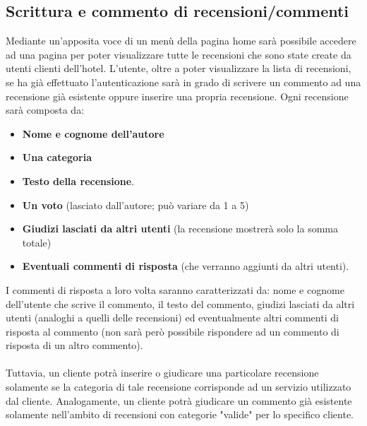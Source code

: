 \documentclass [a4paper, 12pt]{book}
\begin{document}
\subsection{Scrittura e commento di recensioni/commenti}
\label{Recensioni}
Mediante un'apposita voce di un menù della pagina home sarà possibile accedere ad una pagina per poter visualizzare tutte le recensioni che sono state create da utenti clienti dell'hotel. L'utente, oltre a poter visualizzare la lista di recensioni, se ha già effettuato l'autenticazione sarà in grado di scrivere un commento ad una recensione già esistente oppure inserire una propria recensione. Ogni recensione sarà composta da:
\begin{itemize}
\item \textbf{Nome e cognome dell'autore}
\item \textbf{Una categoria}
\item \textbf{Testo della recensione}.
\item \textbf{Un voto} (lasciato dall'autore; può variare da 1 a 5)
\item \textbf{Giudizi lasciati da altri utenti} (la recensione mostrerà solo la somma totale)
\item \textbf{Eventuali commenti di risposta} (che verranno aggiunti da altri utenti).
\end{itemize}
I commenti di risposta a loro volta saranno caratterizzati da: nome e cognome dell'utente che scrive il commento, il testo del commento, giudizi lasciati da altri utenti (analoghi a quelli delle recensioni) ed eventualmente altri commenti di risposta al commento (non sarà però possibile rispondere ad un commento di risposta di un altro commento).\\\\
Tuttavia, un cliente potrà inserire o giudicare una particolare recensione solamente se la categoria di tale recensione corrisponde ad un servizio utilizzato dal cliente. Analogamente, un cliente potrà giudicare un commento già esistente solamente nell'ambito di recensioni con categorie "valide" per lo specifico cliente.

\medskip
\end{document}
